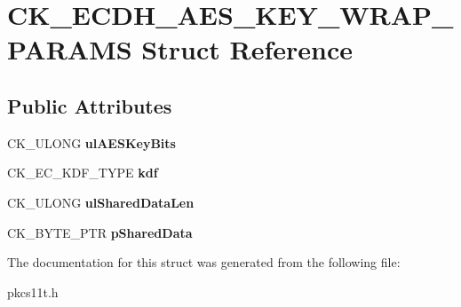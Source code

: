 \hypertarget{struct_c_k___e_c_d_h___a_e_s___k_e_y___w_r_a_p___p_a_r_a_m_s}{}\section{C\+K\+\_\+\+E\+C\+D\+H\+\_\+\+A\+E\+S\+\_\+\+K\+E\+Y\+\_\+\+W\+R\+A\+P\+\_\+\+P\+A\+R\+A\+MS Struct Reference}
\label{struct_c_k___e_c_d_h___a_e_s___k_e_y___w_r_a_p___p_a_r_a_m_s}
\subsection*{Public Attributes}
\begin{DoxyCompactItemize}
\item 
\mbox{\label{struct_c_k___e_c_d_h___a_e_s___k_e_y___w_r_a_p___p_a_r_a_m_s_a95adba11a5558c7f0d7deb80363a373c}} 
C\+K\+\_\+\+U\+L\+O\+NG {\bfseries ul\+A\+E\+S\+Key\+Bits}
\item 
\mbox{\label{struct_c_k___e_c_d_h___a_e_s___k_e_y___w_r_a_p___p_a_r_a_m_s_a8d1902a1141a3e568f6017c6d0f1e570}} 
C\+K\+\_\+\+E\+C\+\_\+\+K\+D\+F\+\_\+\+T\+Y\+PE {\bfseries kdf}
\item 
\mbox{\label{struct_c_k___e_c_d_h___a_e_s___k_e_y___w_r_a_p___p_a_r_a_m_s_a4a13e113ad71c856ad582394640706f5}} 
C\+K\+\_\+\+U\+L\+O\+NG {\bfseries ul\+Shared\+Data\+Len}
\item 
\mbox{\label{struct_c_k___e_c_d_h___a_e_s___k_e_y___w_r_a_p___p_a_r_a_m_s_a2a79450a00f91d8242cba97af3613b4c}} 
C\+K\+\_\+\+B\+Y\+T\+E\+\_\+\+P\+TR {\bfseries p\+Shared\+Data}
\end{DoxyCompactItemize}


The documentation for this struct was generated from the following file\+:\begin{DoxyCompactItemize}
\item 
pkcs11t.\+h\end{DoxyCompactItemize}

